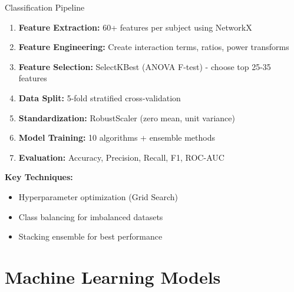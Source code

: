 \documentclass{beamer}
\begin{document}
\begin{frame}{Classification Pipeline}
\begin{enumerate}
  \item \textbf{Feature Extraction:} 60+ features per subject using NetworkX
  \item \textbf{Feature Engineering:} Create interaction terms, ratios, power transforms
  \item \textbf{Feature Selection:} SelectKBest (ANOVA F-test) - choose top 25-35 features
  \item \textbf{Data Split:} 5-fold stratified cross-validation
  \item \textbf{Standardization:} RobustScaler (zero mean, unit variance)
  \item \textbf{Model Training:} 10 algorithms + ensemble methods
  \item \textbf{Evaluation:} Accuracy, Precision, Recall, F1, ROC-AUC
\end{enumerate}

\vskip 0.3cm
\textbf{Key Techniques:}
\begin{itemize}
  \item Hyperparameter optimization (Grid Search)
  \item Class balancing for imbalanced datasets
  \item Stacking ensemble for best performance
\end{itemize}
\end{frame}

\section{Machine Learning Models}
\end{document}
